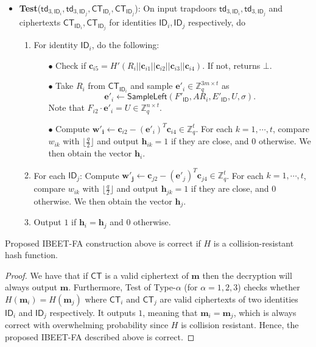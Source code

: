 \documentclass[runningheads,10pt]{llncs}
\def\ZZ{\mathbb{Z}}
\def\bf{\mathbf}
\def\CT{\mathsf{CT}}
\def\SampleLeft{\mathsf{SampleLeft}}
\def\td{\mathsf{td}}
\def\e{\bf{e}}
\def\c{\bf{c}}
\def\ID{\mathsf{ID}}
\begin{document}
\begin{description}
\begin{itemize}
		\item \textbf{Test}($\td_{3,\ID_i},\td_{3,\ID_j},\CT_{\ID_i},\CT_{\ID_j}$): On input trapdoors $\td_{3,\ID_i}, \td_{3,\ID_j}$ and ciphertexts $\CT_{\ID_i},\CT_{\ID_j}$ for identities $\ID_i, \ID_j$ respectively, do 
		\begin{enumerate}
			\item For identity $\ID_i$, do the following:
			\begin{itemize}
				\item[$\bullet$] Check if $\c_{i5}=H'(R_i||\c_{i1}||\c_{i2}||\c_{i3}||\c_{i4})$. If not, returns $\bot$.
				\item[$\bullet$] Take $R_i$ from $\CT_{\ID_i}$ and sample $\e'_i\in\ZZ_q^{3m\times t}$ as
				$$\e'_i\gets\SampleLeft(F'_\ID,AR_i,E'_\ID,U,\sigma).$$
				Note that $F_{i2}\cdot\e'_i=U\in\ZZ_q^{n\times t}.$
				\item[$\bullet$] Compute $\bf{w'_i}\gets\c_{i2}-(\e'_i)^T\c_{i4}\in\ZZ_q^t$. For each $k=1,\cdots, t$, compare $w_{ik}$ with $\lfloor\frac{q}{2}\rfloor$ and output $\bf{h}_{ik}=1$ if they are close, and $0$ otherwise. We then obtain the vector $\bf{h}_i$.
			\end{itemize}
			\item For each $\ID_j$: Compute $\bf{w'_j}\gets\c_{j2}-(\e'_j)^T\c_{j4}\in\ZZ_q^t$. For each $k=1,\cdots, t$, compare $w_{ik}$ with $\lfloor\frac{q}{2}\rfloor$ and output $\bf{h}_{jk}=1$ if they are close, and $0$ otherwise. We then obtain the vector $\bf{h}_j$.
			\item Output $1$ if  $\bf{h}_i=\bf{h}_j$ and $0$ otherwise.
		\end{enumerate}
	\end{itemize}
\end{description}

\begin{theorem}
	Proposed IBEET-FA construction above is correct if $H$  is a collision-resistant hash function.
\end{theorem}
\begin{proof}
	We have that if $\CT$ is a valid ciphertext of $\bf{m}$ then the decryption will always output $\bf{m}$. Furthermore, Test of Type-$\alpha$ (for $\alpha = 1, 2, 3$) checks whether $H(\bf{m}_i)=H(\bf{m}_j)$ where $\CT_i$ and $\CT_j$ are valid ciphertexts of two identities $\ID_i$ and $\ID_j$ respectively. It outputs $1$, meaning that $\bf{m}_i=\bf{m}_j$, which is always correct with overwhelming probability since $H$ is collision resistant. Hence, the proposed IBEET-FA described above is correct.
\end{proof}
\end{document}
